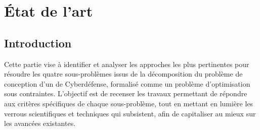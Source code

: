 \clearpage
\thispagestyle{empty}
\null
\newpage

\cleardoublepage
{}
\part{État de l'art}
\label{part:etat_art}

\clearpage
\thispagestyle{empty}
\null
\newpage


\chapter*{Introduction}

\noindent
Cette partie vise à identifier et analyser les approches les plus pertinentes pour résoudre les quatre sous-problèmes issus de la décomposition du problème de conception d'un  de Cyberdéfense, formalisé comme un problème d'optimisation sous contraintes. L'objectif est de recenser les travaux permettant de répondre aux critères spécifiques de chaque sous-problème, tout en mettant en lumière les verrous scientifiques et techniques qui subsistent, afin de capitaliser au mieux sur les avancées existantes.


